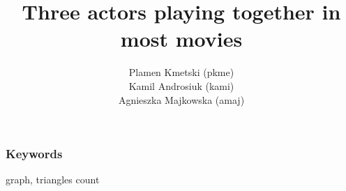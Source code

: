 \documentclass[11pt]{article} %
\title{Three actors playing together in most movies}
\author{Plamen Kmetski (pkme)\\Kamil Androsiuk (kami)\\Agnieszka Majkowska (amaj)}
\begin{document}
\maketitle


\subsubsection*{Keywords}
graph, triangles count






\end{document}
